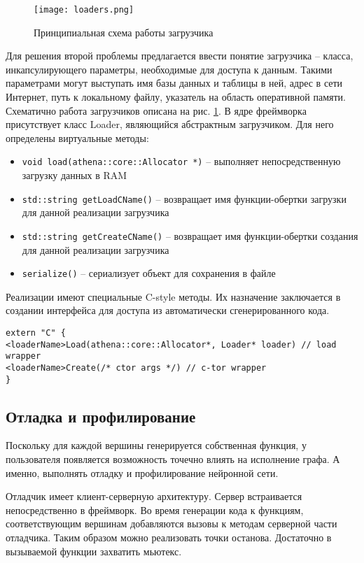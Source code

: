 \begin{figure}[h]
    \centering
    \texttt{[image: loaders.png]}
    \caption{Принципиальная схема работы загрузчика}
    \label{fig:loaders}
\end{figure}

Для решения второй проблемы предлагается ввести понятие загрузчика -- класса,
инкапсулирующего параметры, необходимые для доступа к данным. Такими параметрами
могут выступать имя базы данных и таблицы в ней, адрес в сети Интернет, путь
к локальному файлу, указатель на область оперативной памяти. Схематично
работа загрузчиков описана на рис. \ref{fig:loaders}.
В ядре фреймворка присутствует класс Loader, являющийся абстрактным загрузчиком.
Для него определены виртуальные методы:
\begin{itemize}
    \item \texttt{void load(athena::core::Allocator *)} -- выполняет непосредственную загрузку данных в RAM
    \item \texttt{std::string getLoadCName()} -- возвращает имя функции-обертки загрузки для данной реализации загрузчика
    \item \texttt{std::string getCreateCName()} -- возвращает имя функции-обертки создания для данной реализации загрузчика
    \item \texttt{serialize()} -- сериализует объект для сохранения в файле
\end{itemize}
Реализации имеют специальные C-style методы. Их назначение заключается в
создании интерфейса для доступа из автоматически сгенерированного кода.
\begin{lstlisting}
extern "C" {
<loaderName>Load(athena::core::Allocator*, Loader* loader) // load wrapper
<loaderName>Create(/* ctor args */) // c-tor wrapper
}
\end{lstlisting}

\subsection{Отладка и профилирование}

Поскольку для каждой вершины генерируется собственная функция, у пользователя
появляется возможность точечно влиять на исполнение графа. А именно, выполнять
отладку и профилирование нейронной сети.

Отладчик имеет клиент-серверную архитектуру. Сервер встраивается непосредственно
в фреймворк. Во время генерации кода к функциям, соответствующим вершинам
добавляются вызовы к методам серверной части отладчика. Таким образом можно реализовать
точки останова. Достаточно в вызываемой функции захватить мьютекс.

